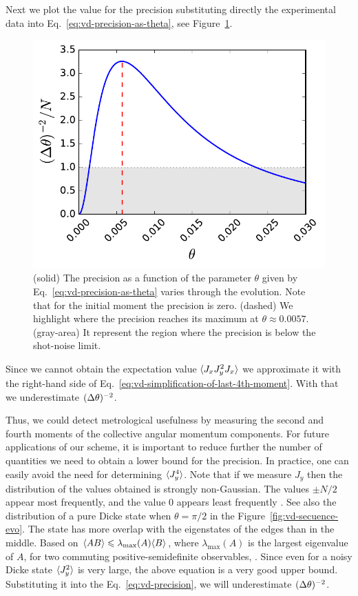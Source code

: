 Next we plot the value for the precision substituting directly the experimental data into Eq.~\eqref{eq:vd-precision-as-theta}, see Figure~\ref{fig:vd-precision-theta-experiment}.
\begin{figure}[htp]
  \centering
  \includegraphics[scale=.65]{img/VD_precision_theta.pdf}
  \caption[Evolution of the precision for $\theta$.]{(solid) The precision as a function of the parameter $\theta$ given by Eq.~\eqref{eq:vd-precision-as-theta} varies through the evolution.
  Note that for the initial moment the precision is zero.
  (dashed) We highlight where the precision reaches its maximum at $\theta \approx 0.0057$.
  (gray-area) It represent the region where the precision is below the shot-noise limit.}
  \label{fig:vd-precision-theta-experiment}
\end{figure}
Since we cannot obtain the expectation value $\langle{J_xJ_y^2J_x}\rangle$ we approximate it with the right-hand side of Eq.~\eqref{eq:vd-simplification-of-last-4th-moment}.
With that we underestimate $(\Delta \theta )^{-2}$.

Thus, we could detect metrological usefulness by measuring the second and fourth moments of the collective angular momentum components.
For future applications of our scheme, it is important to reduce further the number of quantities we need to obtain a lower bound for the precision.
In practice, one can easily avoid the need for determining $\langle{J_y^4}\rangle$.
Note that if we measure $J_y$ then the distribution of the values obtained is strongly non-Gaussian.
The values $\pm N/2$ appear most frequently, and the value 0 appears least frequently \cite{Luecke2011}.
See also the distribution of a pure Dicke state when $\theta=\pi/2$ in the Figure~\ref{fig:vd-secuence-evo}.
The state has more overlap with the eigenstates of the edges than in the middle.
Based on $\langle{AB}\rangle\leqslant\lambda_{\max}(A)\langle{B}\rangle$, where $\lambda_{\max}(A)$ is the largest eigenvalue of $A$, for two commuting positive-semidefinite observables,
\be
  \leqslant{}.
\ee
Since even for a noisy Dicke state $\langle{J_y^2}\rangle$ is very large, the above equation is a very good upper bound.
Substituting it into the Eq.~\eqref{eq:vd-precision}, we will underestimate $(\Delta \theta )^{-2}$.

